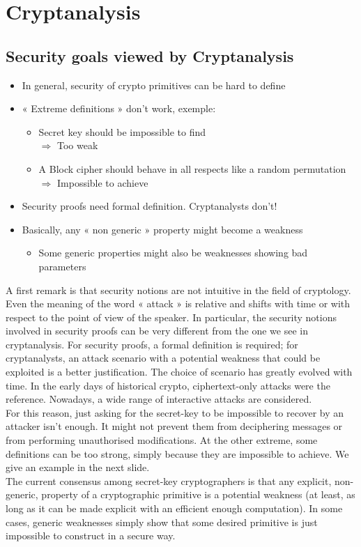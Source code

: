 

\chapter{Cryptanalysis}

\section{Security goals viewed by Cryptanalysis}
	\begin{itemize}
		\item In general, security of crypto primitives can be hard to define
		\item « Extreme definitions » don’t work, exemple:
		\begin{itemize}
			\item Secret key should be impossible to find\\
			$\Rightarrow$ Too weak
			\item A Block cipher should behave in all respects like a random permutation\\
			$\Rightarrow$ Impossible to achieve
		\end{itemize}
		\item Security proofs need formal definition. Cryptanalysts don’t!
		\item Basically, any « non generic » property might become a weakness
		\begin{itemize}
			\item Some generic properties might also be weaknesses showing bad parameters
		\end{itemize}
	\end{itemize}
	A first remark is that security notions are not intuitive in the field of cryptology. 
	Even the meaning of the word « attack » is relative and shifts with time or with respect to the point of view of the speaker. 
	In particular, the security notions involved in security proofs can be very different from the one we see in cryptanalysis. 
	For security proofs, a formal definition is required; for cryptanalysts, an attack scenario with a potential weakness that could be exploited is a better justification. 
	The choice of scenario has greatly evolved with time. 
	In the early days of historical crypto, ciphertext-only attacks were the reference.
	Nowadays, a wide range of interactive attacks are considered.\\
	For this reason, just asking for the secret-key to be impossible to recover by an attacker isn’t enough. 
	It might not prevent them from deciphering messages or from performing unauthorised modifications. 
	At the other extreme, some definitions can be too strong, simply because they are impossible to achieve. 
	We give an example in the next slide.\\
	The current consensus among secret-key cryptographers is that any explicit, non-generic, 
	property of a cryptographic primitive is a potential weakness (at least, as long as it can be made explicit with an efficient enough computation). 
	In some cases, generic weaknesses simply show that some desired primitive is just impossible to construct in a secure way.

